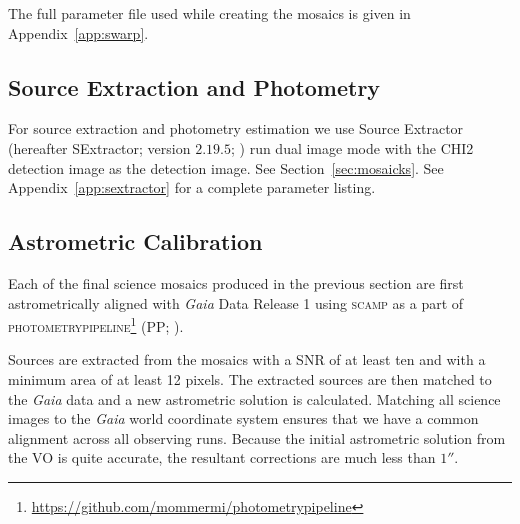\documentclass[apj, revtex4-1]{emulateapj}
\begin{document}

The full parameter file used while creating the mosaics is given in Appendix~\ref{app:swarp}.

\subsection{Source Extraction and Photometry}\label{sec:sextractor}
For source extraction and photometry estimation we use Source Extractor (hereafter SExtractor; version $2.19.5$; \citealt{Bertin1996}) run dual image mode with the CHI2 detection image as the detection image. See Section~\ref{sec:mosaicks}. See Appendix~\ref{app:sextractor} for a complete parameter listing.

\subsection{Astrometric Calibration}
Each of the final science mosaics produced in the previous section are first astrometrically aligned with \textit{Gaia} \citep{GaiaCollaboration2016} Data Release 1 \citep{GaiaCollaboration2016a} using \textsc{scamp} \citep{Bertin2006} as a part of \textsc{photometrypipeline}\footnote{\url{https://github.com/mommermi/photometrypipeline}} (PP; \citealt{Mommert2017}).

Sources are extracted from the mosaics with a SNR of at least ten and with a minimum area of at least 12 pixels. The extracted sources are then matched to the \textit{Gaia} data and a new astrometric solution is calculated. Matching all science images to the \textit{Gaia} world coordinate system ensures that we have a common alignment across all observing runs. Because the initial astrometric solution from the VO is quite accurate, the resultant corrections are much less than $1''$.
\end{document}
